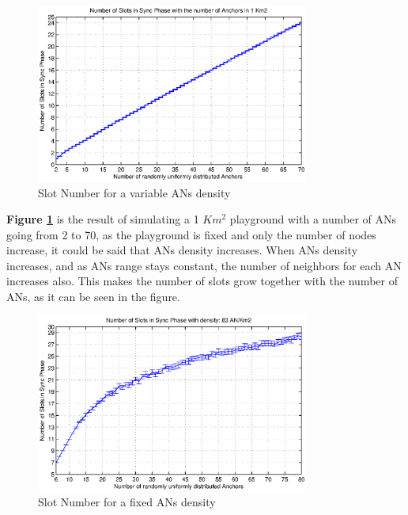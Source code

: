 \begin{figure}[ht]
 \begin{center}
  \includegraphics[width=0.8\textwidth]{numberOfSlotsWithTheAnchorDensity.eps}
 \end{center}
 \caption{Slot Number for a variable \acp{AN} density}
 \label{fig:numberOfSlotsWithTheAnchorDensity}
\end{figure}

\textbf{Figure \ref{fig:numberOfSlotsWithTheAnchorDensity}} is the result of simulating a 1 $Km^2$ playground with a number of \acp{AN} going from 
2 to 70, as the playground is fixed and only the number of nodes increase, it could be said that \acp{AN} density increases. When \acp{AN} density 
increases, and as \acp{AN} range stays constant, the number of neighbors for each \ac{AN} increases also. This makes the number of slots grow together
with the number of \acp{AN}, as it can be seen in the figure.

\begin{figure}[ht]
 \begin{center}
  \includegraphics[width=0.8\textwidth]{numberOfSlotsWithTheSameDensity.eps}
 \end{center}
 \caption{Slot Number for a fixed \acp{AN} density}
 \label{fig:numberOfSlotsWithTheSameDensity}
\end{figure}

